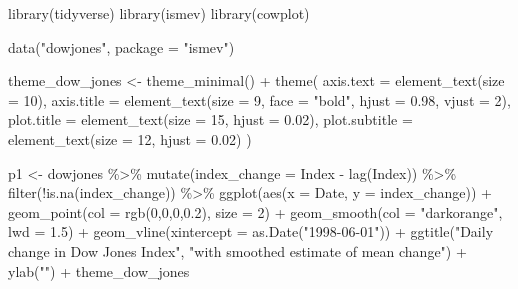 \documentclass[
  letterpaper,
  DIV=11,
  numbers=noendperiod]{scrreprt}
\newenvironment{Shaded}{\begin{snugshade}}{\end{snugshade}}
\newcommand{\AttributeTok}[1]{\textcolor[rgb]{0.40,0.45,0.13}{#1}}
\newcommand{\DecValTok}[1]{\textcolor[rgb]{0.68,0.00,0.00}{#1}}
\newcommand{\FloatTok}[1]{\textcolor[rgb]{0.68,0.00,0.00}{#1}}
\newcommand{\FunctionTok}[1]{\textcolor[rgb]{0.28,0.35,0.67}{#1}}
\newcommand{\NormalTok}[1]{\textcolor[rgb]{0.00,0.23,0.31}{#1}}
\newcommand{\OtherTok}[1]{\textcolor[rgb]{0.00,0.23,0.31}{#1}}
\newcommand{\SpecialCharTok}[1]{\textcolor[rgb]{0.37,0.37,0.37}{#1}}
\newcommand{\StringTok}[1]{\textcolor[rgb]{0.13,0.47,0.30}{#1}}
\begin{document}
\begin{Shaded}
\begin{Highlighting}[]
\FunctionTok{library}\NormalTok{(tidyverse)}
\FunctionTok{library}\NormalTok{(ismev)}
\FunctionTok{library}\NormalTok{(cowplot)}

\FunctionTok{data}\NormalTok{(}\StringTok{"dowjones"}\NormalTok{, }\AttributeTok{package =} \StringTok{"ismev"}\NormalTok{) }

\NormalTok{theme\_dow\_jones }\OtherTok{\textless{}{-}} \FunctionTok{theme\_minimal}\NormalTok{() }\SpecialCharTok{+}
  \FunctionTok{theme}\NormalTok{(}
    \AttributeTok{axis.text =} \FunctionTok{element\_text}\NormalTok{(}\AttributeTok{size =} \DecValTok{10}\NormalTok{),}
    \AttributeTok{axis.title =} \FunctionTok{element\_text}\NormalTok{(}\AttributeTok{size =} \DecValTok{9}\NormalTok{, }\AttributeTok{face =} \StringTok{"bold"}\NormalTok{,  }\AttributeTok{hjust =} \FloatTok{0.98}\NormalTok{, }\AttributeTok{vjust =} \DecValTok{2}\NormalTok{),}
    \AttributeTok{plot.title =} \FunctionTok{element\_text}\NormalTok{(}\AttributeTok{size =} \DecValTok{15}\NormalTok{, }\AttributeTok{hjust =} \FloatTok{0.02}\NormalTok{),}
    \AttributeTok{plot.subtitle =} \FunctionTok{element\_text}\NormalTok{(}\AttributeTok{size =} \DecValTok{12}\NormalTok{, }\AttributeTok{hjust =} \FloatTok{0.02}\NormalTok{)}
\NormalTok{  )}

\NormalTok{p1 }\OtherTok{\textless{}{-}}\NormalTok{ dowjones }\SpecialCharTok{\%\textgreater{}\%} 
  \FunctionTok{mutate}\NormalTok{(}\AttributeTok{index\_change =}\NormalTok{ Index }\SpecialCharTok{{-}} \FunctionTok{lag}\NormalTok{(Index)) }\SpecialCharTok{\%\textgreater{}\%} 
  \FunctionTok{filter}\NormalTok{(}\SpecialCharTok{!}\FunctionTok{is.na}\NormalTok{(index\_change)) }\SpecialCharTok{\%\textgreater{}\%} 
  \FunctionTok{ggplot}\NormalTok{(}\FunctionTok{aes}\NormalTok{(}\AttributeTok{x =}\NormalTok{ Date, }\AttributeTok{y =}\NormalTok{ index\_change)) }\SpecialCharTok{+} 
  \FunctionTok{geom\_point}\NormalTok{(}\AttributeTok{col =} \FunctionTok{rgb}\NormalTok{(}\DecValTok{0}\NormalTok{,}\DecValTok{0}\NormalTok{,}\DecValTok{0}\NormalTok{,}\FloatTok{0.2}\NormalTok{), }\AttributeTok{size =} \DecValTok{2}\NormalTok{) }\SpecialCharTok{+} 
  \FunctionTok{geom\_smooth}\NormalTok{(}\AttributeTok{col =} \StringTok{"darkorange"}\NormalTok{, }\AttributeTok{lwd =} \FloatTok{1.5}\NormalTok{) }\SpecialCharTok{+}
  \FunctionTok{geom\_vline}\NormalTok{(}\AttributeTok{xintercept =} \FunctionTok{as.Date}\NormalTok{(}\StringTok{"1998{-}06{-}01"}\NormalTok{)) }\SpecialCharTok{+}
  \FunctionTok{ggtitle}\NormalTok{(}\StringTok{"Daily change in Dow Jones Index"}\NormalTok{, }\StringTok{"with smoothed estimate of mean change"}\NormalTok{) }\SpecialCharTok{+}
  \FunctionTok{ylab}\NormalTok{(}\StringTok{""}\NormalTok{) }\SpecialCharTok{+}
\NormalTok{  theme\_dow\_jones}


\end{Highlighting}
\end{Shaded}
\end{document}
